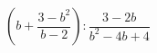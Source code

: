 \begin{ex}[type=expression]
	\begin{condition}
		\(\left( b+\dfrac{3-b^2}{b-2} \right):\dfrac{3-2b}{b^2-4b+4}\)
	\end{condition}
\end{ex}